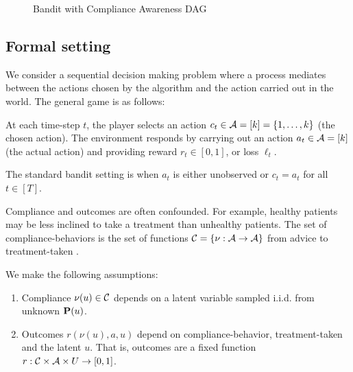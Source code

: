 \begin{figure*}[t]
	\centering	
	
	\caption{Bandit with Compliance Awareness DAG}
\end{figure*}


\subsection{Formal setting}
\label{sec:formal}
  

We consider a sequential decision making problem where a process mediates between the actions chosen by the algorithm and the action carried out in the world. The general game is as follows:

\begin{defn}\label{def:compliance_bandit}\eod
	At each time-step $t$, the player selects an action $c_t\in {\mathcal A}=[k]=\{1,\ldots,k\}$ (the chosen action). The environment responds by carrying out an action $a_t\in{\mathcal A}=[k]$ (the actual action) and providing reward $r_t\in[0,1]$, or loss $\ell_t$.

	The standard bandit setting is when $a_t$ is either unobserved or $c_t = a_t$ for all $t\in[T]$.
\end{defn}

Compliance and outcomes are often confounded. For example, healthy patients may be less inclined to take a treatment than unhealthy patients. 
The set of compliance-behaviors is the set of functions ${\mathcal C}=\{\nu:{\mathcal A}\rightarrow{\mathcal A}\}$ from advice to treatment-taken \cite{koller:09}. 

\begin{defn}\label{def:assumptions}\eod
	We make the following assumptions:
	\begin{enumerate}
		\item Compliance $\nu(u)\in{\mathcal C}$ depends on a latent variable sampled i.i.d. from unknown  ${\mathbf P}(u)$.
		\item Outcomes $r(\nu(u), a,u)$ depend on compliance-behavior, treatment-taken and the latent $u$. That is, outcomes are a fixed function $r:{\mathcal C}\times {\mathcal A}\times U\rightarrow[0,1]$.		
	\end{enumerate}
\end{defn}

